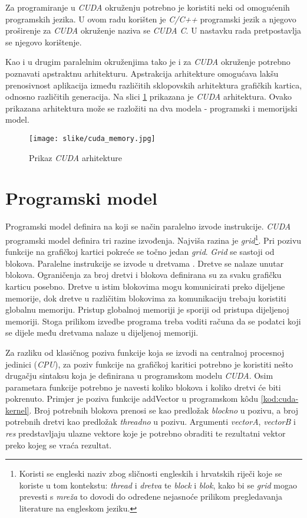 \documentclass[times, utf8, zavrsni, numeric, sort]{fer}
\begin{document}
Za programiranje u \emph{CUDA} okruženju potrebno je koristiti neki od omogućenih programskih jezika. U ovom radu korišten je \emph{C/C++} programski jezik a njegovo proširenje za \emph{CUDA} okruženje naziva se \emph{CUDA C}. U nastavku rada pretpostavlja se njegovo korištenje.

Kao i u drugim paralelnim okruženjima tako je i za \emph{CUDA} okruženje potrebno poznavati apstraktnu arhitekturu. Apstrakcija arhitekture omogućava lakšu prenosivnost aplikacija između različitih sklopovskih arhitektura grafičkih kartica, odnosno različitih generacija. Na slici \ref{fig:cuda_arh} prikazana je \emph{CUDA} arhitektura. Ovako prikazana arhitektura može se razložiti na dva modela - programski i memorijski model.

\begin{figure}[htb]
\centering
\texttt{[image: slike/cuda\_memory.jpg]}
\caption{Prikaz \emph{CUDA} arhitekture}
\label{fig:cuda_arh}
\end{figure}

\section{Programski model}
Programski model definira na koji se način paralelno izvode instrukcije. \emph{CUDA} programski model definira tri razine izvođenja. Najviša razina je \emph{grid}\footnote{Koristi se engleski naziv zbog sličnosti engleskih i hrvatskih riječi koje se koriste u tom kontekstu: \emph{thread} i \emph{dretva} te \emph{block} i \emph{blok}, kako bi se \emph{grid} mogao prevesti s \emph{mreža} to dovodi do određene nejasnoće prilikom pregledavanja literature na engleskom jeziku.}. Pri pozivu funkcije  na grafičkoj kartici pokreće se točno jedan \emph{grid}. \emph{Grid} se sastoji od blokova. Paralelne instrukcije se izvode u dretvama . Dretve se nalaze unutar blokova. Ograničenja za broj dretvi i blokova definirana su za svaku grafičku karticu posebno. Dretve u istim blokovima mogu komunicirati preko dijeljene memorije, dok dretve u različitim blokovima za komunikaciju trebaju koristiti globalnu memoriju. Pristup globalnoj memoriji je sporiji od pristupa dijeljenoj memoriji. Stoga prilikom izvedbe programa treba voditi računa da se podatci koji se dijele među dretvama nalaze u dijeljenoj memoriji.

Za razliku od klasičnog poziva funkcije koja se izvodi na centralnoj procesnoj jedinici (\emph{CPU}), za poziv funkcije na grafičkoj karitici potrebno je koristiti nešto drugačju sintaksu koja je definirana u programskom modelu \emph{CUDA}. Osim parametara funkcije potrebno je navesti koliko blokova i koliko dretvi će biti pokrenuto. Primjer je poziva funkcije addVector u programskom k\^{o}du \ref{kod:cuda-kernel}. Broj potrebnih blokova prenosi se kao predložak \emph{blockno} u pozivu, a broj potrebnih dretvi kao predložak \emph{threadno} u pozivu. Argumenti \emph{vectorA}, \emph{vectorB} i \emph{res} predstavljaju ulazne vektore koje je potrebno obraditi te rezultatni vektor preko kojeg se vraća rezultat.
\end{document}

